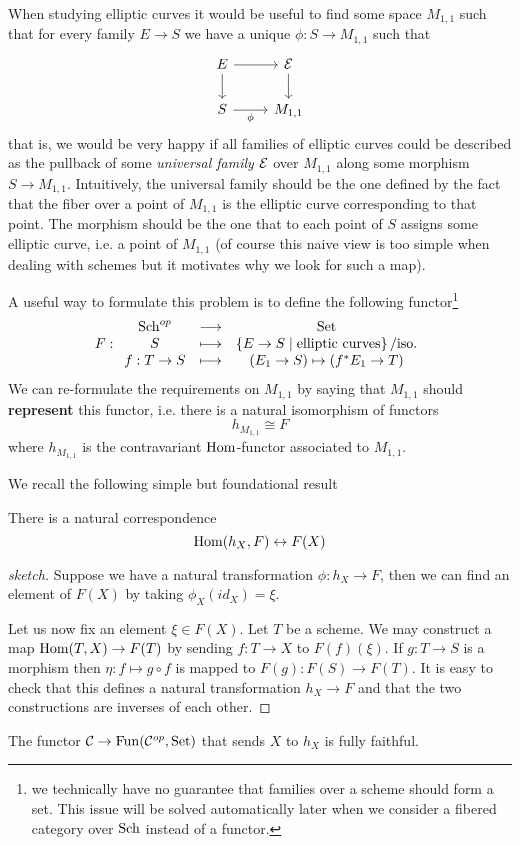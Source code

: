 When studying elliptic curves it would be useful to find some space $M_{1,1}$ such that for every family $E\to S$ we have a unique $\phi:S\to M_{1,1}$ such that
\[\begin{tikzcd}
	E & \Ec \\
	S & {M_{1,1}}
	\arrow[from=1-1, to=1-2]
	\arrow[from=1-1, to=2-1]
	\arrow[from=1-2, to=2-2]
	\arrow["\phi"', from=2-1, to=2-2]
\end{tikzcd}\]
that is, we would be very happy if all families of elliptic curves could be described as the pullback of some \textit{universal family} $\mathcal{E}$ over $M_{1,1}$ along some morphism $S\to M_{1,1}$. Intuitively, the universal family should be the one defined by the fact that the fiber over a point of $M_{1,1}$ is the elliptic curve corresponding to that point. The morphism should be the one that to each point of $S$ assigns some elliptic curve, i.e. a point of $M_{1,1}$ (of course this naive view is too simple when dealing with schemes but it motivates why we look for such a map).
\bigskip

A useful way to formulate this problem is to define the following functor\footnote{we technically have no guarantee that families over a scheme should form a set. This issue will be solved automatically later when we consider a fibered category over $\mathrm{Sch}$ instead of a functor.}
\[F:\begin{array}{ccc} {\mathrm{Sch}^{op}} & \longrightarrow & {\mathrm{Set}}\\ {S} & \longmapsto & {\left\{{E\to S\mid \text{elliptic curves}}\right\}/\text{iso.}}\\ {f:T\to S} & \longmapsto & {(E_1\to S)\mapsto (f^\ast E_1\to T)} \end{array}\]
We can re-formulate the requirements on $M_{1,1}$ by saying that $M_{1,1}$ should \textbf{represent} this functor, i.e. there is a natural isomorphism of functors
\[h_{M_{1,1}}\cong F\]
where $h_{M_{1,1}}$ is the contravariant $\operatorname{Hom}$-functor associated to $M_{1,1}$.
\medskip

We recall the following simple but foundational result
\begin{theorem}
There is a natural correspondence
\[\operatorname{Hom}(h_X,F)\leftrightarrow F(X)\]
\end{theorem}
\begin{proof}[sketch]
Suppose we have a natural transformation $\phi:h_X\to F$, then we can find an element of $F(X)$ by taking $\phi_X(id_X)=\xi$.

Let us now fix an element $\xi\in F(X)$. Let $T$ be a scheme. We may construct a map $\operatorname{Hom}(T,X)\to F(T)$ by sending $f:T\to X$ to $F(f)(\xi)$. If $g:T\to S$ is a morphism then $\eta:f\mapsto g\circ f$ is mapped to $F(g):F(S)\to F(T)$. It is easy to check that this defines a natural transformation $h_X\to F$ and that the two constructions are inverses of each other.
\end{proof}
\begin{corollary}
The functor $\mathcal{C}\to \operatorname{Fun}(\mathcal{C}^{op},\mathrm{Set})$ that sends $X$ to $h_X$ is fully faithful.
\end{corollary}


